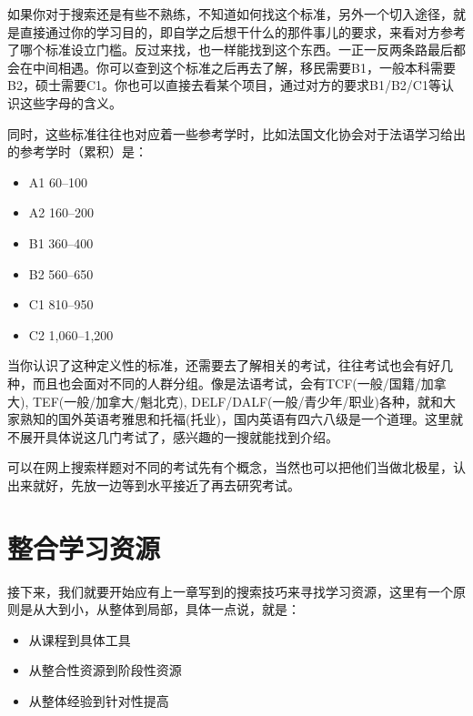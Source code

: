 \documentclass[
]{book}
\providecommand{\tightlist}{%
  \setlength{\itemsep}{0pt}\setlength{\parskip}{0pt}}
\begin{document}
如果你对于搜索还是有些不熟练，不知道如何找这个标准，另外一个切入途径，就是直接通过你的学习目的，即自学之后想干什么的那件事儿的要求，来看对方参考了哪个标准设立门槛。反过来找，也一样能找到这个东西。一正一反两条路最后都会在中间相遇。你可以查到这个标准之后再去了解，移民需要B1，一般本科需要B2，硕士需要C1。你也可以直接去看某个项目，通过对方的要求B1/B2/C1等认识这些字母的含义。

同时，这些标准往往也对应着一些参考学时，比如法国文化协会对于法语学习给出的参考学时（累积）是：

\begin{itemize}
\tightlist
\item
  A1 60--100\\
\item
  A2 160--200\\
\item
  B1 360--400\\
\item
  B2 560--650\\
\item
  C1 810--950
\item
  C2 1,060--1,200
\end{itemize}

当你认识了这种定义性的标准，还需要去了解相关的考试，往往考试也会有好几种，而且也会面对不同的人群分组。像是法语考试，会有TCF(一般/国籍/加拿大), TEF(一般/加拿大/魁北克), DELF/DALF(一般/青少年/职业)各种，就和大家熟知的国外英语考雅思和托福(托业)，国内英语有四六八级是一个道理。这里就不展开具体说这几门考试了，感兴趣的一搜就能找到介绍。

可以在网上搜索样题对不同的考试先有个概念，当然也可以把他们当做北极星，认出来就好，先放一边等到水平接近了再去研究考试。

\hypertarget{ux6574ux5408ux5b66ux4e60ux8d44ux6e90}{%
\section{整合学习资源}\label{ux6574ux5408ux5b66ux4e60ux8d44ux6e90}}

接下来，我们就要开始应有上一章写到的搜索技巧来寻找学习资源，这里有一个原则是从大到小，从整体到局部，具体一点说，就是：

\begin{itemize}
\tightlist
\item
  从课程到具体工具
\item
  从整合性资源到阶段性资源
\item
  从整体经验到针对性提高
\end{itemize}
\end{document}
